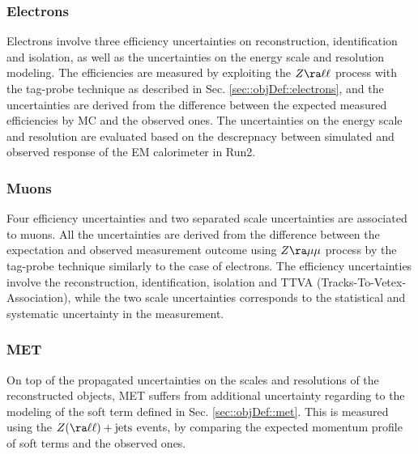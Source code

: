 

\subsubsection{Electrons}
Electrons involve three efficiency uncertainties on reconstruction, identification and isolation, as well as the uncertainties on the energy scale and resolution modeling.
The efficiencies are measured by exploiting the $Z\ra\ell\ell$ process with the tag-probe technique as described in Sec. \ref{sec::objDef::electrons}, and the uncertainties are derived from the difference between the expected measured efficiencies by MC and the observed ones.
The uncertainties on the energy scale and resolution are evaluated based on the descrepnacy between simulated and observed response of the EM calorimeter in Run2.  \\



\subsubsection{Muons}
Four efficiency uncertainties and two separated scale uncertainties are associated to muons.
All the uncertainties are derived from the difference between the expectation and observed measurement outcome using $Z\ra\mu\mu$ process by the tag-probe technique similarly to the case of electrons. 
The efficiency uncertainties involve the reconstruction, identification, isolation and TTVA (Tracks-To-Vetex-Association), while the two scale uncertainties corresponds to the statistical and systematic uncertainty in the measurement. \\


\subsubsection{MET} 
On top of the propagated uncertainties on the scales and resolutions of the reconstructed objects, MET suffers from additional uncertainty regarding to the modeling of the soft term defined in Sec. \ref{sec::objDef::met}.
This is measured using the $Z (\ra\ell\ell)+\mathrm{jets}$ events, by comparing the expected momentum profile of soft terms and the observed ones.  \\


